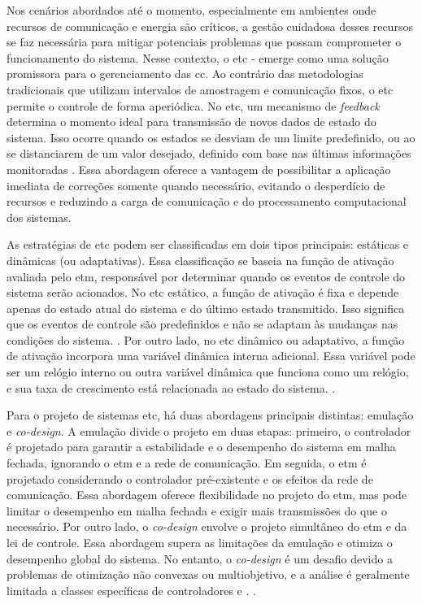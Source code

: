 Nos cenários abordados até o momento, especialmente em ambientes onde recursos de comunicação e energia são críticos, a gestão cuidadosa desses recursos se faz necessária para mitigar potenciais problemas que possam comprometer o funcionamento do sistema. Nesse contexto, o \acrfull{etc} - emerge como uma solução promissora para o gerenciamento das  \acrshort{cc}. Ao contrário das metodologias tradicionais que utilizam intervalos de amostragem e comunicação fixos, o \acrshort{etc} permite o controle de forma aperiódica. No \acrshort{etc}, um mecanismo de \textit{feedback} determina o momento ideal para transmissão de novos dados de estado do sistema. Isso ocorre quando os estados se desviam de um limite predefinido, ou ao se distanciarem de um valor desejado, definido com base nas últimas informações monitoradas \citep{coutinho2021}. Essa abordagem oferece a vantagem de possibilitar a aplicação imediata de correções somente quando necessário, evitando o desperdício de recursos e reduzindo a carga de comunicação e do processamento computacional dos sistemas.

As estratégias de \acrshort{etc} podem ser classificadas em dois tipos principais: estáticas e dinâmicas (ou adaptativas). Essa classificação se baseia na função de ativação avaliada pelo \acrshort{etm}, responsável por determinar quando os eventos de controle do sistema serão acionados. No \acrshort{etc} estático, a função de ativação é fixa e depende apenas do estado atual do sistema e do último estado transmitido. Isso significa que os eventos de controle são predefinidos e não se adaptam às mudanças nas condições do sistema. \citep{coutinho2021}. Por outro lado, no \acrshort{etc} dinâmico ou adaptativo, a função de ativação incorpora uma variável dinâmica interna adicional. Essa variável pode ser um relógio interno ou outra variável dinâmica que funciona como um relógio, e sua taxa de crescimento está relacionada ao estado do sistema. \citep{Girard2015}.

Para o projeto de sistemas \acrshort{etc}, há duas abordagens principais distintas: emulação e \textit{co-design}. A emulação divide o projeto em duas etapas: primeiro, o controlador é projetado para garantir a estabilidade e o desempenho do sistema em malha fechada, ignorando o \acrshort{etm} e a rede de comunicação. Em seguida, o \acrshort{etm} é projetado considerando o controlador pré-existente e os efeitos da rede de comunicação. Essa abordagem oferece flexibilidade no projeto do \acrshort{etm}, mas pode limitar o desempenho em malha fechada e exigir mais transmissões do que o necessário. Por outro lado, o \textit{co-design} envolve o projeto simultâneo do \acrshort{etm} e da lei de controle. Essa abordagem supera as limitações da emulação e otimiza o desempenho global do sistema. No entanto, o \textit{co-design} é um desafio devido a problemas de otimização não convexas ou multiobjetivo, e a análise é geralmente limitada a classes específicas de controladores e . \citep{coutinho2021}.


